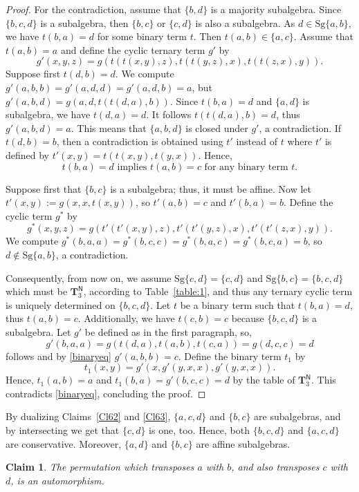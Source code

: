 \documentclass[11pt]{amsart}
\newcommand{\n}{\scriptscriptstyle{\mathsf{N}}}
\theoremstyle{definition}
\theoremstyle{remark}
\theoremstyle{plain}
\newtheorem{claim}[thm]{Claim}
\def\T{\mathbf{T}}
\begin{document}
\begin{enumerate}[wide, labelindent=0pt]
\begin{proof}
For the contradiction, assume that $\{b,d\}$ is a majority subalgebra.
Since $\{b,c,d\}$ is a subalgebra, then $\{b,c\}$ or $\{c,d\}$ is also a subalgebra.
As $d\in\mathrm{Sg}\{a,b\}$, we have $t(b,a)=d$ for some binary term $t$. Then $t(a,b)\in\{a,c\}$. Assume that $t(a,b)=a$ and define the cyclic ternary term $g'$ by $$g'(x,y,z)=g(t(t(x,y),z),t(t(y,z),x),t(t(z,x),y)).$$
Suppose first $t(d,b)=d$. We compute $g'(a,b,b)=g'(a,d,d)=g'(a,d,b)=a$, but $g'(a,b,d)=g(a,d,t(t(d,a),b))$. Since $t(b,a)=d$ and $\{a,d\}$ is subalgebra, we have $t(d,a)=d$. It follows $t(t(d,a),b)=d$, thus $g'(a,b,d)=a$. This means that $\{a,b,d\}$ is closed under $g'$, a contradiction. If $t(d,b)=b$, then a contradiction is obtained using $t'$ instead of $t$ where $t'$ is defined by $t'(x,y)=t(t(x,y),t(y,x))$. Hence, 
\begin{equation}\tag{$\ast$}\label{binaryeq}
t(b,a)=d\text{ implies }t(a,b)=c\text{ for any binary term }t.
\end{equation}

Suppose first that $\{b,c\}$ is a subalgebra; thus, it must be affine. Now let $t'(x,y):=g(x,x,t(x,y))$, so $t'(a,b)=c$ and $t'(b,a)=b$. Define the cyclic term $g^*$ by $$g^*(x,y,z)=g(t'(t'(x,y),z),t'(t'(y,z),x),t'(t'(z,x),y)).$$ We compute $g^*(b,a,a)= g^*(b,c,c)=g^*(b,a,c)=g^*(b,c,a)=b$, so $d\notin\mathrm{Sg}\{a,b\}$, a contradiction.

Consequently, from now on, we assume $\mathrm{Sg}\{c,d\}=\{c,d\}$ and $\mathrm{Sg}\{b,c\}=\{b,c,d\}$ which must be $\T^{\n}_3$, according to Table~\ref{table:1}, and thus any ternary cyclic term is uniquely determined on $\{b,c,d\}$. Let $t$ be a binary term such that $t(b,a)=d$, thus $t(a,b)=c$. Additionally, we have $t(c,b)=c$ because $\{b,c,d\}$ is a subalgebra. Let $g'$ be defined as in the first paragraph, so, $$g'(b,a,a)=g(t(d,a),t(a,b),t(c,a))=g(d,c,c)=d$$ follows and by \eqref{binaryeq} $g'(a,b,b)=c$. Define the binary term $t_1$ by $$t_1(x,y)=g'(x,g'(y,x,x),g'(y,x,x)).$$
Hence, $t_1(a,b)=a$ and $t_1(b,a)=g'(b,c,c)=d$ by the table of $\T^{\n}_3$. This contradicts \eqref{binaryeq}, concluding the proof.
\end{proof}

By dualizing Claims~\ref{Cl62} and \ref{Cl63}, $\{a,c,d\}$ and $\{b,c\}$ are subalgebras, and by intersecting we get that $\{c,d\}$ is one, too. Hence, both $\{b,c,d\}$ and $\{a,c,d\}$ are conservative. Moreover, $\{a,d\}$ and $\{b,c\}$ are affine subalgebras. 

\begin{claim}\label{automorphism claim}
The permutation which transposes $a$ with $b$, and also transposes $c$ with $d$, is an automorphism.
\end{claim}


\end{enumerate}
\end{document}
